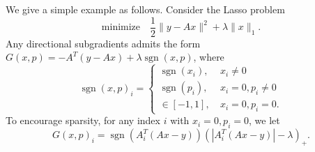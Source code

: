 \documentclass[twoside,11pt]{article}
\newcommand{\norm}[1]{\|#1\|}
\begin{document}
We give a simple example as follows. Consider the Lasso problem
\[
\mbox{minimize}\quad \frac{1}{2}\norm{y - Ax}^2 + \lambda \norm{x}_1.
\]
Any directional subgradients admits the form $G(x, p) = -A^T(y - Ax) + \lambda\mathop{\mathrm{sgn}}(x, p)$, where 
\[
\mathop{\mathrm{sgn}}(x, p)_i=
\begin{cases}
\mathop{\mathrm{sgn}}(x_i),~ &x_i \ne 0\\
\mathop{\mathrm{sgn}}(p_i), ~ &x_i = 0, p_i \ne 0\\
\in [-1, 1],~ &x_i = 0, p_i = 0.
\end{cases}
\]
To encourage sparsity, for any index $i$ with $x_i = 0, p_i = 0$, we let
\[
G(x, p)_i = \mathop{\mathrm{sgn}}\left( A_i^T(Ax-y) \right) \left( |A_i^T(Ax-y)|-\lambda \right)_+.
\]
\end{document}
